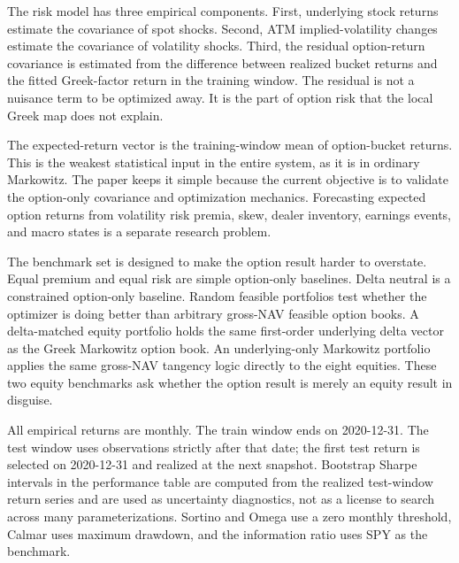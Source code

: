 The risk model has three empirical components. First, underlying stock returns estimate
the covariance of spot shocks. Second, ATM implied-volatility changes estimate the
covariance of volatility shocks. Third, the residual option-return covariance is estimated
from the difference between realized bucket returns and the fitted Greek-factor return in
the training window. The residual is not a nuisance term to be optimized away. It is the
part of option risk that the local Greek map does not explain.

The expected-return vector is the training-window mean of option-bucket returns. This is
the weakest statistical input in the entire system, as it is in ordinary Markowitz. The
paper keeps it simple because the current objective is to validate the option-only
covariance and optimization mechanics. Forecasting expected option returns from volatility
risk premia, skew, dealer inventory, earnings events, and macro states is a separate
research problem.

The benchmark set is designed to make the option result harder to overstate. Equal premium
and equal risk are simple option-only baselines. Delta neutral is a constrained
option-only baseline. Random feasible portfolios test whether the optimizer is
doing better than arbitrary gross-NAV feasible option books. A delta-matched equity
portfolio holds the same first-order underlying delta vector as the Greek Markowitz option
book. An underlying-only Markowitz portfolio applies the same gross-NAV tangency logic
directly to the eight equities. These two equity benchmarks ask whether the option result
is merely an equity result in disguise.

All empirical returns are monthly. The train window ends on 2020-12-31. The test window
uses observations strictly after that date; the first test return is selected on
2020-12-31 and realized at the next snapshot. Bootstrap Sharpe intervals in the
performance table are computed from the realized test-window return series and are used as
uncertainty diagnostics, not as a license to search across many parameterizations.
Sortino and Omega use a zero monthly threshold, Calmar uses maximum drawdown, and the
information ratio uses SPY as the benchmark.
